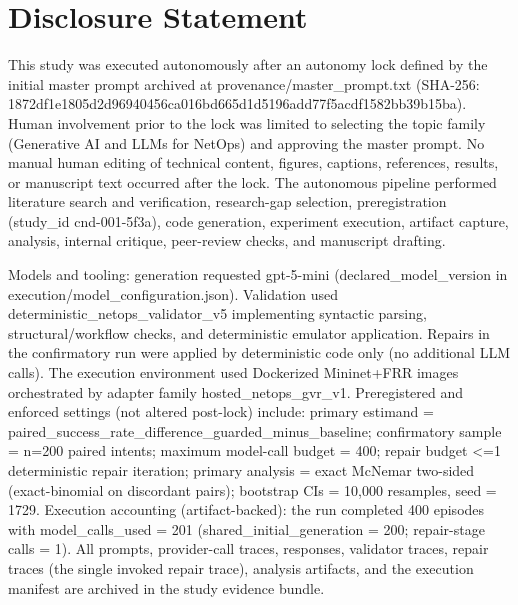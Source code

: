 \documentclass[conference]{IEEEtran}
\begin{document}
\section*{Disclosure Statement}
This study was executed autonomously after an autonomy lock defined by the initial master prompt archived at provenance/master\_prompt.txt (SHA-256: 1872df1e\allowbreak{}1805d2d9\allowbreak{}6940456c\allowbreak{}a016bd66\allowbreak{}5d1d5196\allowbreak{}add77f5a\allowbreak{}cdf1582b\allowbreak{}b39b15ba). Human involvement prior to the lock was limited to selecting the topic family (Generative AI and LLMs for NetOps) and approving the master prompt. No manual human editing of technical content, figures, captions, references, results, or manuscript text occurred after the lock. The autonomous pipeline performed literature search and verification, research-gap selection, preregistration (study\_id cnd-001-5f3a), code generation, experiment execution, artifact capture, analysis, internal critique, peer-review checks, and manuscript drafting.

Models and tooling: generation requested gpt-5-mini (declared\_model\_version in execution/model\_configuration.json). Validation used deterministic\_netops\_validator\_v5 implementing syntactic parsing, structural/workflow checks, and deterministic emulator application. Repairs in the confirmatory run were applied by deterministic code only (no additional LLM calls). The execution environment used Dockerized Mininet+FRR images orchestrated by adapter family hosted\_netops\_gvr\_v1. Preregistered and enforced settings (not altered post-lock) include: primary estimand = paired\_success\_rate\_difference\_guarded\_minus\_baseline; confirmatory sample = n=200 paired intents; maximum model-call budget = 400; repair budget <=1 deterministic repair iteration; primary analysis = exact McNemar two-sided (exact-binomial on discordant pairs); bootstrap CIs = 10,000 resamples, seed = 1729. Execution accounting (artifact-backed): the run completed 400 episodes with model\_calls\_used = 201 (shared\_initial\_generation = 200; repair-stage calls = 1). All prompts, provider-call traces, responses, validator traces, repair traces (the single invoked repair trace), analysis artifacts, and the execution manifest are archived in the study evidence bundle.
\end{document}
